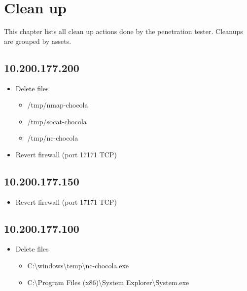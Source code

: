 \chapter{Clean up}

This chapter lists all clean up actions done by the penetration tester. Cleanups are grouped by assets.

\section{10.200.177.200}

\begin{itemize}
  \item Delete files
    \begin{itemize}
        \item /tmp/nmap-chocola
        \item /tmp/socat-chocola
        \item /tmp/nc-chocola
    \end{itemize}
  \item Revert firewall (port 17171 TCP)
\end{itemize}

\section{10.200.177.150}

\begin{itemize}
  \item Revert firewall (port 17171 TCP)
\end{itemize}

\section{10.200.177.100}

\begin{itemize}
  \item Delete files
    \begin{itemize}
        \item C:\textbackslash windows\textbackslash temp\textbackslash nc-chocola.exe
        \item C:\textbackslash Program Files (x86)\textbackslash System Explorer\textbackslash System.exe
    \end{itemize}
\end{itemize}
